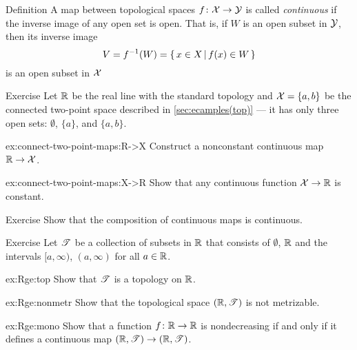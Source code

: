 \begin{thm}{Definition}\label{def:cont-top}
A map between topological spaces 
$f\colon\mathcal{X}\to\mathcal{Y}$ is called \emph{continuous} if the inverse image of any open set is open.
That is, if $W$ is an open subset in $\mathcal{Y}$, then its inverse image
\[V=f^{-1}(W)=\left\{\,{x\in X}\,\middle|\,{f(x)\in W}\,\right\}\]
is an open subset in $\mathcal{X}$
\end{thm}

\begin{thm}{Exercise}\label{ex:connect-two-point-maps}
Let $\mathbb{R}$ be the real line with the standard topology
and $\mathcal{X}=\{a,b\}$ be the connected two-point space described in \ref{sec:ecamples(top)} --- it has only three open sets: $\emptyset$, $\{a\}$, and $\{a,b\}$.

\begin{subthm}{ex:connect-two-point-maps:R->X}
Construct a nonconstant continuous map $\mathbb{R}\to \mathcal{X}$.
\end{subthm}

\begin{subthm}{ex:connect-two-point-maps:X->R}
Show that any continuous function $\mathcal{X}\to \mathbb{R}$ is constant.
\end{subthm}

\end{thm}

\begin{thm}{Exercise}\label{ex:composition-continuous}
Show that the composition of continuous maps is continuous. 
\end{thm}


\begin{thm}{Exercise}\label{ex:Rge}
Let $\mathscr{T}$ be a collection of subsets in $\mathbb{R}$ that consists of $\emptyset$, $\mathbb{R}$ and the intervals $[a,\infty)$, $(a,\infty)$ for all $a\in\mathbb{R}$.


\begin{subthm}{ex:Rge:top}
Show that $\mathscr{T}$ is a topology on $\mathbb{R}$.
\end{subthm}

\begin{subthm}{ex:Rge:nonmetr}
Show that the topological space $(\mathbb{R},\mathscr{T})$ is not metrizable.
\end{subthm}

\begin{subthm}{ex:Rge:mono}
Show that a function $f\colon\mathbb{R}\to\mathbb{R}$ is nondecreasing if and only if it defines a continuous map $(\mathbb{R},\mathscr{T})\to (\mathbb{R},\mathscr{T})$.
\end{subthm}

\end{thm}




